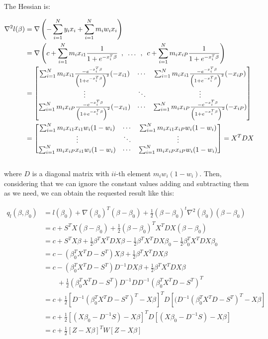 \documentclass{article}
\begin{document}
The Hessian is:

\begin{align*}
\nabla^2 l(\beta)&=\nabla \left(-\sum_{i=1}^N y_i x_i+\sum_{i=1}^N m_i w_i x_i\right)\\
				 &=\nabla \left( c+\sum_{i=1}^N m_i x_{i1}\frac{1}{1+e^{-x_i^T\beta}}\enskip,\enskip \dots \enskip,\enskip c+\sum_{i=1}^N m_i x_{iP}\frac{1}{1+e^{-x_i^T\beta}} \right)\\
				 &=\begin{bmatrix} \sum_{i=1}^N m_i x_{i1}\frac{-e^{-x_i^T\beta}}{\left(1+e^{-x_i^T\beta}\right)^2}(-x_{i1}) & \cdots & \sum_{i=1}^N m_i x_{i1}\frac{-e^{-x_i^T\beta}}{\left(1+e^{-x_i^T\beta}\right)^2}(-x_{iP}) \\ \vdots & \ddots & \vdots \\ \sum_{i=1}^N m_i x_{iP}\frac{-e^{-x_i^T\beta}}{\left(1+e^{-x_i^T\beta}\right)^2}(-x_{i1}) & \cdots & \sum_{i=1}^N m_i x_{iP}\frac{-e^{-x_i^T\beta}}{\left(1+e^{-x_i^T\beta}\right)^2}(-x_{iP}) \end{bmatrix}\\
				 &=\begin{bmatrix} \sum_{i=1}^N m_i x_{i1}x_{i1}w_i(1-w_i) & \cdots & \sum_{i=1}^N m_i x_{i1}x_{iP}w_i(1-w_i) \\ \vdots & \ddots & \vdots \\ \sum_{i=1}^N m_i x_{iP}x_{i1}w_i(1-w_i) & \cdots & \sum_{i=1}^N m_i x_{iP}x_{iP}w_i(1-w_i) \end{bmatrix}=X^TDX
\end{align*}\\

where $D$ is a diagonal matrix with $ii$-th element $m_i w_i (1-w_i)$. Then, considering that we can ignore the constant values adding and subtracting them as we need, we can obtain the requested result like this:

\begin{align*}
q_l(\beta,\beta_0)&=l(\beta_0)+\nabla(\beta_0)^T(\beta-\beta_0)+\frac{1}{2}(\beta-\beta_0)^t\nabla^2(\beta_0)(\beta-\beta_0)\\
				  &=c+S^TX(\beta-\beta_0)+\frac{1}{2}(\beta-\beta_0)^TX^TDX(\beta-\beta_0)\\				  
				  &=c+S^TX\beta+\frac{1}{2}\beta^TX^TDX\beta-\frac{1}{2}\beta^TX^TDX\beta_0-\frac{1}{2}\beta_0^TX^TDX\beta_0\\
				  &=c-(\beta_0^TX^TD-S^T)X\beta+\frac{1}{2}\beta^TX^TDX\beta\\
				  &=c-(\beta_0^TX^TD-S^T)D^{-1}DX\beta+\frac{1}{2}\beta^TX^TDX\beta\\
				  &\qquad+\frac{1}{2}(\beta_0^TX^TD-S^T)D^{-1}DD^{-1}(\beta_0^TX^TD-S^T)^T\\
				  &=c+\frac{1}{2}[D^{-1}(\beta_0^TX^TD-S^T)^T-X\beta]^TD[(D^{-1}(\beta_0^TX^TD-S^T)^T-X\beta]\\
				  &=c+\frac{1}{2}[(X\beta_0-D^{-1}S)-X\beta]^TD[(X\beta_0-D^{-1}S)-X\beta]\\
 				  &=c+\frac{1}{2}[Z-X\beta]^TW[Z-X\beta]
\end{align*}\\
\end{document}
